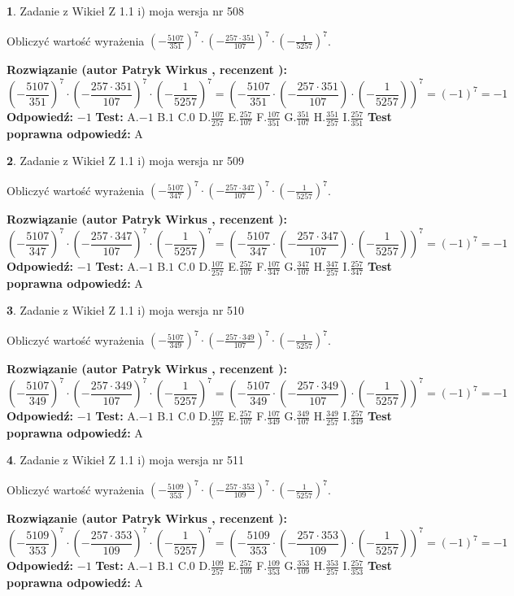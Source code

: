\documentclass[12pt, a4paper]{article}
\theoremstyle{definition} %
\newtheorem{zad}{}
\newcommand{\zadStart}[1]{\begin{zad}#1\newline}
\newcommand{\zadStop}{\end{zad}}
\newcommand{\rozwStart}[2]{\noindent \textbf{Rozwiązanie (autor #1 , recenzent #2): }\newline}
\newcommand{\rozwStop}{\newline}
\newcommand{\odpStart}{\noindent \textbf{Odpowiedź:}\newline}
\newcommand{\odpStop}{\newline}
\newcommand{\testStart}{\noindent \textbf{Test:}\newline}
\newcommand{\testStop}{\newline}
\newcommand{\kluczStart}{\noindent \textbf{Test poprawna odpowiedź:}\newline}
\newcommand{\kluczStop}{\newline}
\begin{document}
\zadStart{Zadanie z Wikieł Z 1.1 i) moja wersja nr 508}

Obliczyć wartość wyrażenia $(-\frac{5107}{351})^{7} \cdot (-\frac{257 \cdot 351}{107})^{7} \cdot (-\frac{1}{5257})^{7}$.
\zadStop
\rozwStart{Patryk Wirkus}{}
$$(-\frac{5107}{351})^{7} \cdot (-\frac{257 \cdot 351}{107})^{7} \cdot (-\frac{1}{5257})^{7} = (-\frac{5107}{351} \cdot (-\frac{257 \cdot 351}{107}) \cdot (-\frac{1}{5257}))^{7} = (-1)^{7} = -1$$
\rozwStop
\odpStart
$-1$
\odpStop
\testStart
A.$-1$ B.$1$ C.$0$ D.$\frac{107}{257}$ E.$\frac{257}{107}$
F.$\frac{107}{351}$ G.$\frac{351}{107}$
H.$\frac{351}{257}$
I.$\frac{257}{351}$
\testStop
\kluczStart
A
\kluczStop



\zadStart{Zadanie z Wikieł Z 1.1 i) moja wersja nr 509}

Obliczyć wartość wyrażenia $(-\frac{5107}{347})^{7} \cdot (-\frac{257 \cdot 347}{107})^{7} \cdot (-\frac{1}{5257})^{7}$.
\zadStop
\rozwStart{Patryk Wirkus}{}
$$(-\frac{5107}{347})^{7} \cdot (-\frac{257 \cdot 347}{107})^{7} \cdot (-\frac{1}{5257})^{7} = (-\frac{5107}{347} \cdot (-\frac{257 \cdot 347}{107}) \cdot (-\frac{1}{5257}))^{7} = (-1)^{7} = -1$$
\rozwStop
\odpStart
$-1$
\odpStop
\testStart
A.$-1$ B.$1$ C.$0$ D.$\frac{107}{257}$ E.$\frac{257}{107}$
F.$\frac{107}{347}$ G.$\frac{347}{107}$
H.$\frac{347}{257}$
I.$\frac{257}{347}$
\testStop
\kluczStart
A
\kluczStop



\zadStart{Zadanie z Wikieł Z 1.1 i) moja wersja nr 510}

Obliczyć wartość wyrażenia $(-\frac{5107}{349})^{7} \cdot (-\frac{257 \cdot 349}{107})^{7} \cdot (-\frac{1}{5257})^{7}$.
\zadStop
\rozwStart{Patryk Wirkus}{}
$$(-\frac{5107}{349})^{7} \cdot (-\frac{257 \cdot 349}{107})^{7} \cdot (-\frac{1}{5257})^{7} = (-\frac{5107}{349} \cdot (-\frac{257 \cdot 349}{107}) \cdot (-\frac{1}{5257}))^{7} = (-1)^{7} = -1$$
\rozwStop
\odpStart
$-1$
\odpStop
\testStart
A.$-1$ B.$1$ C.$0$ D.$\frac{107}{257}$ E.$\frac{257}{107}$
F.$\frac{107}{349}$ G.$\frac{349}{107}$
H.$\frac{349}{257}$
I.$\frac{257}{349}$
\testStop
\kluczStart
A
\kluczStop



\zadStart{Zadanie z Wikieł Z 1.1 i) moja wersja nr 511}

Obliczyć wartość wyrażenia $(-\frac{5109}{353})^{7} \cdot (-\frac{257 \cdot 353}{109})^{7} \cdot (-\frac{1}{5257})^{7}$.
\zadStop
\rozwStart{Patryk Wirkus}{}
$$(-\frac{5109}{353})^{7} \cdot (-\frac{257 \cdot 353}{109})^{7} \cdot (-\frac{1}{5257})^{7} = (-\frac{5109}{353} \cdot (-\frac{257 \cdot 353}{109}) \cdot (-\frac{1}{5257}))^{7} = (-1)^{7} = -1$$
\rozwStop
\odpStart
$-1$
\odpStop
\testStart
A.$-1$ B.$1$ C.$0$ D.$\frac{109}{257}$ E.$\frac{257}{109}$
F.$\frac{109}{353}$ G.$\frac{353}{109}$
H.$\frac{353}{257}$
I.$\frac{257}{353}$
\testStop
\kluczStart
A
\kluczStop
\end{document}
